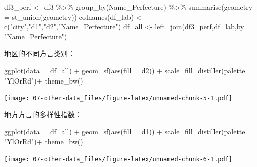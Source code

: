\documentclass[
  oneside]{book}
\newenvironment{Shaded}{\begin{snugshade}}{\end{snugshade}}
\newcommand{\AttributeTok}[1]{\textcolor[rgb]{0.77,0.63,0.00}{#1}}
\newcommand{\FunctionTok}[1]{\textcolor[rgb]{0.00,0.00,0.00}{#1}}
\newcommand{\NormalTok}[1]{#1}
\newcommand{\OtherTok}[1]{\textcolor[rgb]{0.56,0.35,0.01}{#1}}
\newcommand{\SpecialCharTok}[1]{\textcolor[rgb]{0.00,0.00,0.00}{#1}}
\newcommand{\StringTok}[1]{\textcolor[rgb]{0.31,0.60,0.02}{#1}}
\begin{document}
\begin{Shaded}
\begin{Highlighting}[]
\NormalTok{df3\_perf }\OtherTok{\textless{}{-}}\NormalTok{ df3 }\SpecialCharTok{\%\textgreater{}\%}
  \FunctionTok{group\_by}\NormalTok{(Name\_Perfecture) }\SpecialCharTok{\%\textgreater{}\%}
  \FunctionTok{summarise}\NormalTok{(}\AttributeTok{geometry =} \FunctionTok{st\_union}\NormalTok{(geometry))}
\FunctionTok{colnames}\NormalTok{(df\_lab) }\OtherTok{\textless{}{-}} \FunctionTok{c}\NormalTok{(}\StringTok{"city"}\NormalTok{,}\StringTok{"d1"}\NormalTok{,}\StringTok{"d2"}\NormalTok{,}\StringTok{"Name\_Perfecture"}\NormalTok{)}
\NormalTok{df\_all }\OtherTok{\textless{}{-}} \FunctionTok{left\_join}\NormalTok{(df3\_perf,df\_lab,}\AttributeTok{by =} \StringTok{"Name\_Perfecture"}\NormalTok{)}
\end{Highlighting}
\end{Shaded}

地区的不同方言类别：

\begin{Shaded}
\begin{Highlighting}[]
\FunctionTok{ggplot}\NormalTok{(}\AttributeTok{data =}\NormalTok{ df\_all) }\SpecialCharTok{+}
  \FunctionTok{geom\_sf}\NormalTok{(}\FunctionTok{aes}\NormalTok{(}\AttributeTok{fill =}\NormalTok{ d2)) }\SpecialCharTok{+}
  \FunctionTok{scale\_fill\_distiller}\NormalTok{(}\AttributeTok{palette =} \StringTok{"YlOrRd"}\NormalTok{)}\SpecialCharTok{+}
  \FunctionTok{theme\_bw}\NormalTok{()}
\end{Highlighting}
\end{Shaded}

\texttt{[image: 07-other-data\_files/figure-latex/unnamed-chunk-5-1.pdf]}

地方方言的多样性指数：

\begin{Shaded}
\begin{Highlighting}[]
\FunctionTok{ggplot}\NormalTok{(}\AttributeTok{data =}\NormalTok{ df\_all) }\SpecialCharTok{+}
  \FunctionTok{geom\_sf}\NormalTok{(}\FunctionTok{aes}\NormalTok{(}\AttributeTok{fill =}\NormalTok{ d1)) }\SpecialCharTok{+}
  \FunctionTok{scale\_fill\_distiller}\NormalTok{(}\AttributeTok{palette =} \StringTok{"YlOrRd"}\NormalTok{)}\SpecialCharTok{+}
  \FunctionTok{theme\_bw}\NormalTok{()}
\end{Highlighting}
\end{Shaded}

\texttt{[image: 07-other-data\_files/figure-latex/unnamed-chunk-6-1.pdf]}
\end{document}

